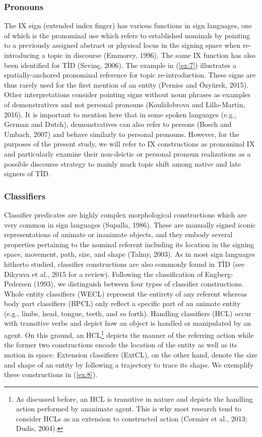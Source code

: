 \documentclass[]{elsarticle} %
\begin{document}
\hypertarget{pronouns}{%
\subsubsection{Pronouns}\label{pronouns}}

The IX sign (extended index finger) has various functions in sign
languages, one of which is the pronominal use which refers to
established nominals by pointing to a previously assigned abstract or
physical locus in the signing space when re-introducing a topic in
discourse (Emmorey, 1996). The same IX function has also been identified
for TİD (Sevinç, 2006). The example in (\ref{ex:7}) illustrates a
spatially-anchored pronominal reference for topic re-introduction. These
signs are thus rarely used for the first mention of an entity (Perniss
and Özyürek, 2015). Other interpretations consider pointing signs
without noun phrases as examples of demonstratives and not personal
pronouns (Koulidobrova and Lillo-Martin, 2016). It is important to
mention here that in some spoken languages (e.g., German and Dutch),
demonstratives can also refer to persons (Bosch and Umbach, 2007) and
behave similarly to personal pronouns. However, for the purposes of the
present study, we will refer to IX constructions as pronominal IX and
particularly examine their non-deictic or personal pronoun realizations
as a possible discourse strategy to mainly mark topic shift among native
and late signers of TİD.

\hypertarget{classifiers}{%
\subsubsection{Classifiers}\label{classifiers}}

Classifier predicates are highly complex morphological constructions
which are very common in sign languages (Supalla, 1986). These are
manually signed iconic representations of animate or inanimate objects,
and they embody several properties pertaining to the nominal referent
including its location in the signing space, movement, path, size, and
shape (Talmy, 2003). As in most sign languages hitherto studied,
classifier constructions are also commonly found in TİD (see Dikyuva et
al., 2015 for a review). Following the classification of
Engberg-Pedersen (1993), we distinguish between four types of classifier
constructions. Whole entity classifiers (WECL) represent the entirety of
any referent whereas body part classifiers (BPCL) only reflect a
specific part of an animate entity (e.g., limbs, head, tongue, teeth,
and so forth). Handling classifiers (HCL) occur with transitive verbs
and depict how an object is handled or manipulated by an agent. On this
ground, an HCL\footnote{As discussed before, an HCL is transitive in
  nature and depicts the handling action performed by ananimate agent.
  This is why most research tend to consider HCLs as an extension to
  constructed action (Cormier et al., 2013; Dudis, 2004).} depicts the
manner of the referring action while the former two constructions encode
the location of the entity as well as its motion in space. Extension
classifiers (ExtCL), on the other hand, denote the size and shape of an
entity by following a trajectory to trace its shape. We exemplify these
constructions in (\ref{ex:8}).
\end{document}
